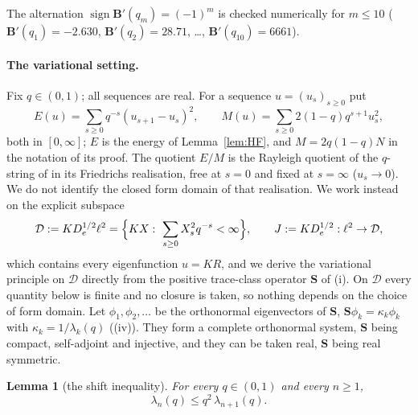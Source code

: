 \documentclass[11pt]{article}
\theoremstyle{plain}
\newtheorem{lemma}[theorem]{Lemma}
\theoremstyle{definition}
\theoremstyle{remark}
\begin{document}
\noindent The alternation $\operatorname{sign}\mathbf B'(q_m)=(-1)^m$ is checked numerically for
$m\le10$ ($\mathbf B'(q_1)=-2.630$, $\mathbf B'(q_2)=28.71$, \dots, $\mathbf B'(q_{10})=6661$).

\paragraph{The variational setting.} Fix $q\in(0,1)$; all sequences are real. For a sequence
$u=(u_s)_{s\ge0}$ put
\[
   E(u)=\sum_{s\ge0}q^{-s}(u_{s+1}-u_s)^2,\qquad M(u)=\sum_{s\ge0}2(1-q)q^{s+1}u_s^2,
\]
both in $[0,\infty]$; $E$ is the energy of Lemma~\ref{lem:HF}, and $M=2q(1-q)N$ in the notation of
its proof. The quotient $E/M$ is the Rayleigh quotient of the $q$-string of
{\cite[Remark ``a $q$-string'', \textup{rem:qstring}]{Bonfioli2026bA}} in its Friedrichs
realisation, free at $s=0$ and fixed at $s=\infty$ ($u_s\to0$). We do not identify the closed form
domain of that realisation. We work instead on the explicit subspace
\[
   \mathcal D:=KD_e^{1/2}\ell^2=\Bigl\{KX:\ \sum_{s\ge0}X_s^2q^{-s}<\infty\Bigr\},\qquad
   J:=KD_e^{1/2}:\ell^2\to\mathcal D ,
\]
which contains every eigenfunction $u=KR$, and we derive the variational principle on $\mathcal D$
directly from the positive trace-class operator $\mathbf S$ of
{\cite[Theorem ``the travel determinant'', \textup{thm:fredholm}]{Bonfioli2026bA}}\textup{(i)}. On
$\mathcal D$ every quantity below is finite and no closure is taken, so nothing depends on the choice
of form domain. Let $\phi_1,\phi_2,\dots$ be the orthonormal eigenvectors of $\mathbf S$,
$\mathbf S\phi_k=\kappa_k\phi_k$ with $\kappa_k=1/\lambda_k(q)$
({\cite[Theorem ``the travel determinant'', \textup{thm:fredholm}]{Bonfioli2026bA}}\textup{(iv)}).
They form a complete orthonormal system, $\mathbf S$ being compact, self-adjoint and injective, and
they can be taken real, $\mathbf S$ being real symmetric.

\begin{lemma}[the shift inequality]\label{lem:shift}
For every $q\in(0,1)$ and every $n\ge1$,
\[
   \lambda_n(q)\le q^2\,\lambda_{n+1}(q).
\]
\end{lemma}
\end{document}
